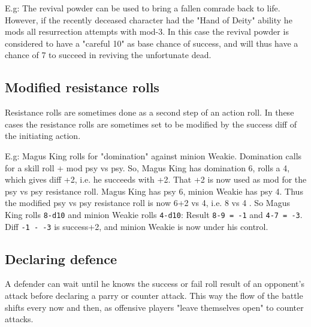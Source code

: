E.g: The revival powder can be used to bring a fallen comrade back to life. However, if the recently deceased character had the "Hand of Deity" ability he mods all resurrection attempts with mod-3. In this case the revival powder is considered to have a "careful 10" as base chance of success, and will thus have a chance of 7 to succeed in reviving the unfortunate dead.


\subsection*{Modified resistance rolls}
Resistance rolls are sometimes done as a second step of an action roll. In these cases the resistance rolls are sometimes set to be modified by the success diff of the initiating action.

E.g: Magus King rolls for "domination" against minion Weakie. Domination calls for a skill roll + mod psy vs psy. So, Magus King has domination 6, rolls a 4, which gives diff +2, i.e. he succeeds with +2. That +2 is now used as mod for the psy vs psy resistance roll. Magus King has psy 6, minion Weakie has psy 4. Thus the modified psy vs psy resistance roll is now 6+2 vs 4, i.e. 8 vs 4
. So Magus King rolls \verb|8-d10| and minion Weakie rolls \verb|4-d10|: Result \verb|8-9 = -1| and \verb|4-7 = -3|. Diff \verb|-1 - -3| is success+2, and minion Weakie is now under his control.



\subsection*{Declaring defence}
A defender can wait until he knows the success or fail roll result of an opponent's attack before declaring a parry or counter attack. This way the flow of the battle shifts every now and then, as offensive players "leave themselves open" to counter attacks.

